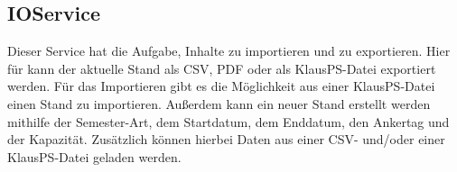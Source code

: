 \subsection{IOService}\label{subsec:ioservice}
Dieser Service hat die Aufgabe, Inhalte zu importieren und zu exportieren.
Hier für kann der aktuelle Stand als CSV, PDF oder als KlausPS-Datei exportiert werden.
Für das Importieren gibt es die Möglichkeit aus einer KlausPS-Datei einen Stand zu importieren.
Außerdem kann ein neuer Stand erstellt werden mithilfe der Semester-Art, dem Startdatum, dem Enddatum, den Ankertag und der Kapazität.
Zusätzlich können hierbei Daten aus einer CSV- und/oder einer KlausPS-Datei geladen werden.
